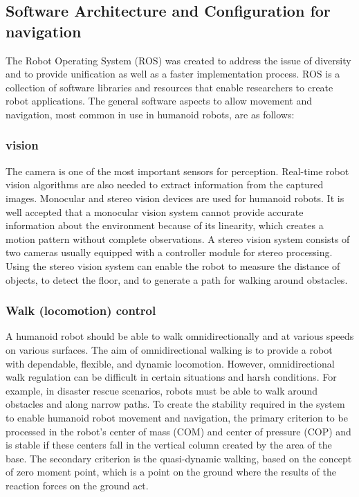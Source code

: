 \documentclass[conference]{IEEEtran}
\begin{document}
\subsection{Software Architecture and Configuration for navigation}
The Robot Operating System (ROS) was created to address the issue of diversity and to provide unification as well as a faster implementation process\autocite{5saeedvand2019comprehensive}. ROS is a collection of software libraries and resources that enable researchers to create robot applications.
The general software aspects to allow movement and navigation, most common in use in humanoid robots, are as follows:

\subsubsection{vision}
The camera is one of the most important sensors for perception. Real-time robot vision algorithms are also needed to extract information from the captured images. Monocular and stereo vision devices are used for humanoid robots. It is well accepted that a monocular vision system cannot provide accurate information about the environment because of its linearity, which creates a motion pattern without complete observations. A stereo vision system consists of two cameras usually equipped with a controller module for stereo processing. Using the stereo vision system can enable the robot to measure the distance of objects, to detect the floor, and to generate a path for walking around obstacles\autocite{5saeedvand2019comprehensive}.

\subsubsection{Walk (locomotion) control}
A humanoid robot should be able to walk omnidirectionally and at various speeds on various surfaces. The aim of omnidirectional walking is to provide a robot with dependable, flexible, and dynamic locomotion. However, omnidirectional walk regulation can be difficult in certain situations and harsh conditions. For example, in disaster rescue scenarios, robots must be able to walk around obstacles and along narrow paths.
To create the stability required in the system to enable humanoid robot movement and navigation, the primary criterion to be processed in the robot’s center of mass (COM) and center of pressure (COP) and is stable if these centers fall in the vertical column created by the area of the base\autocite{12wang2012optimizing}. The secondary criterion is the quasi-dynamic walking, based on the concept of zero moment point, which is a point on the ground where the results of the reaction forces on the ground act.
\end{document}

